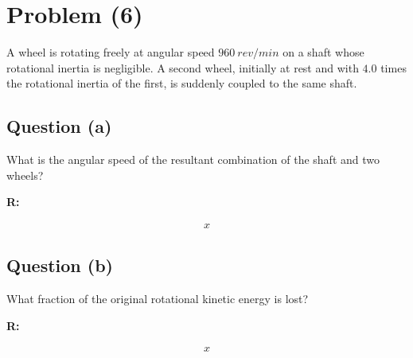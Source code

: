 \section{Problem (6)}
	A wheel is rotating freely at angular speed $960 \ rev/min$ on a shaft whose rotational inertia is negligible. A second wheel, initially at rest and with $4.0$ times the rotational inertia of the first, is suddenly coupled to the same shaft.

	\subsection{Question (a)}

		What is the angular speed of the resultant combination of the shaft and two wheels?

		\textbf{R:}

		\begin{align}
			x
		\end{align}

	\subsection{Question (b)}

		What fraction of the original rotational kinetic energy is lost?

		\textbf{R:}

		\begin{align}
			x
		\end{align}
